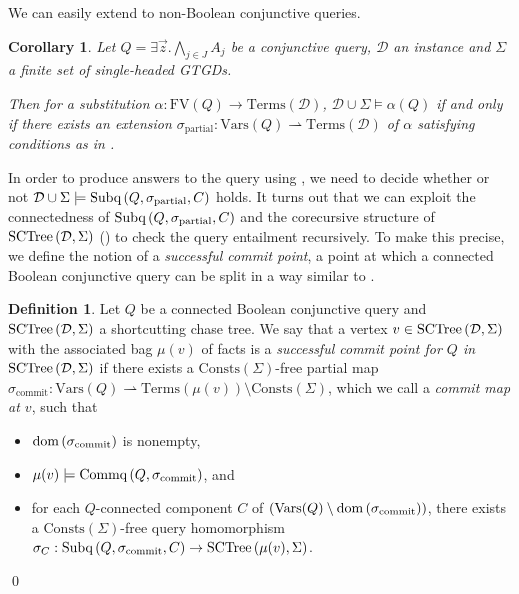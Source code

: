 \documentclass[12pt]{report}
\theoremstyle{plain}
\newtheorem{corollary}[theorem]{Corollary}
\theoremstyle{definition}
\newtheorem{definition}[theorem]{Definition}
\def\FV{{\mathrm{FV}}}
\def\Vars{{\mathrm{Vars}}}
\def\Consts{{\mathrm{Consts}}}
\def\Terms{{\mathrm{Terms}}}
\newcommand{\dom}[1]{\ensuremath{\normalfont{\operatorname{dom}} \left( #1 \right)}}
\newcommand{\SCTree}[2]{\ensuremath{\normalfont{\textrm{SCTree}} \left( #1, #2 \right)}}
\newcommand{\Subq}[3]{\ensuremath{\normalfont{\textrm{Subq}} \left( #1, #2, #3 \right)}}
\newcommand{\Commq}[2]{\ensuremath{\normalfont{\textrm{Commq}} \left( #1, #2 \right)}}
\begin{document}
We can easily extend  to non-Boolean conjunctive queries.

\begin{corollary}
\label{base-connected-query-decomposition}
  Let $Q = \exists \vec{z}. \bigwedge_{j \in J} A_j$ be a conjunctive query, $\mathcal{D}$ an instance and $\Sigma$ a finite set of single-headed GTGDs.
  
  Then for a substitution $\alpha: \FV(Q) \rightarrow \Terms(\mathcal{D})$, $\mathcal{D} \cup \Sigma \models \alpha(Q)$ if and only if there exists an extension $\sigma_{\mathrm{partial}}: \Vars(Q) \rightharpoonup \Terms(\mathcal{D})$ of $\alpha$ satisfying conditions as in .
\end{corollary}


In order to produce answers to the query using , we need to decide whether or not $\mathcal{D} \cup \Sigma \models \Subq{Q}{\sigma_{\mathrm{partial}}}{C}$ holds. It turns out that we can exploit the connectedness of $\Subq{Q}{\sigma_{\mathrm{partial}}}{C}$ and the corecursive structure of $\SCTree{\mathcal{D}}{\Sigma}$ () to check the query entailment recursively. To make this precise, we define the notion of a \emph{successful commit point}, a point at which a connected Boolean conjunctive query can be split in a way similar to .

\begin{definition}
\label{successful-commit-point-definition}
  Let $Q$ be a connected Boolean conjunctive query and $\SCTree{\mathcal{D}}{\Sigma}$ a shortcutting chase tree. We say that a vertex $v \in \SCTree{\mathcal{D}}{\Sigma}$ with the associated bag $\mu(v)$ of facts is a \emph{successful commit point for $Q$ in $\SCTree{\mathcal{D}}{\Sigma}$} if there exists a $\Consts(\Sigma)$-free partial map $\sigma_{\mathrm{commit}}: \Vars(Q) \rightharpoonup \Terms(\mu(v)) \setminus \Consts(\Sigma)$, which we call a \emph{commit map at $v$}, such that
  \begin{itemize}
    \item $\dom{\sigma_{\mathrm{commit}}}$ is nonempty,
    \item $\mu(v) \models \Commq{Q}{\sigma_{\mathrm{commit}}}$, and
    \item for each $Q$-connected component $C$ of $(\Vars(Q) \setminus \dom{\sigma_{\mathrm{commit}}})$, there exists a $\Consts(\Sigma)$-free query homomorphism $\sigma_C: \Subq{Q}{\sigma_{\mathrm{commit}}}{C} \rightarrow \SCTree{\mu(v)}{\Sigma}$.
  \end{itemize}
  \qed
\end{definition}
\end{document}
